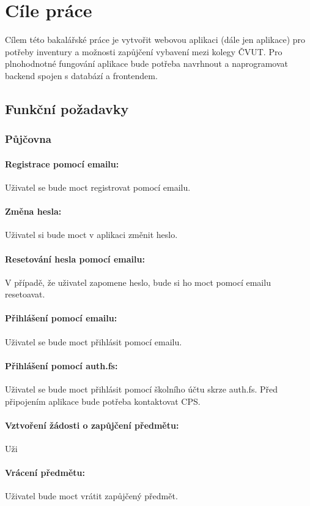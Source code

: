 \documentclass[12pt, a4paper]{article}
\begin{document}
\section{Cíle práce}
Cílem této bakalářské práce je vytvořit webovou aplikaci (dále jen aplikace) pro potřeby inventury a možnosti zapůjčení vybavení mezi kolegy ČVUT. Pro plnohodnotné fungování aplikace bude potřeba navrhnout a naprogramovat backend spojen s databází a frontendem.
\subsection{Funkční požadavky}
\subsubsection{Půjčovna}
\paragraph{Registrace pomocí emailu:}
Uživatel se bude moct registrovat pomocí emailu.
\paragraph{Změna hesla:}
Uživatel si bude moct v aplikaci změnit heslo.
\paragraph{Resetování hesla pomocí emailu:}
V případě, že uživatel zapomene heslo, bude si ho moct pomocí emailu resetoavat.
\paragraph{Přihlášení pomocí emailu:}
Uživatel se bude moct přihlásit pomocí emailu.
\paragraph{Přihlášení pomocí auth.fs:}
Uživatel se bude moct přihlásit pomocí školního účtu skrze auth.fs. Před připojením aplikace bude potřeba kontaktovat CPS.
\paragraph{Vztvoření žádosti o zapůjčení předmětu:}Uži
\paragraph{Vrácení předmětu:}
Uživatel bude moct vrátit zapůjčený předmět.
\end{document}
